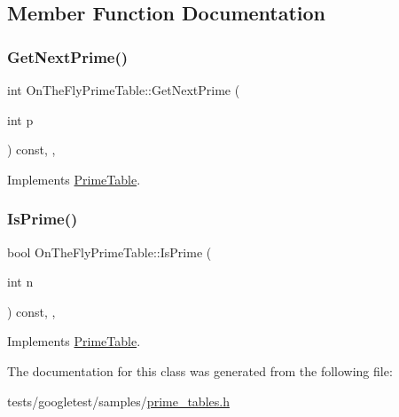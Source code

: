 \subsection{Member Function Documentation}
\mbox{\label{classOnTheFlyPrimeTable_a0f6f934f318407a812098e67584b60bf}} 
\subsubsection{\texorpdfstring{Get\+Next\+Prime()}{GetNextPrime()}}
{\footnotesize\ttfamily int On\+The\+Fly\+Prime\+Table\+::\+Get\+Next\+Prime (\begin{DoxyParamCaption}\item[{int}]{p }\end{DoxyParamCaption}) const\hspace{0.3cm}{\ttfamily [inline]}, {\ttfamily [override]}, {\ttfamily [virtual]}}



Implements \hyperlink{classPrimeTable_ae537c939f56617d8937d57bbbae3ab30}{Prime\+Table}.

\mbox{\label{classOnTheFlyPrimeTable_ac8236514299e4558a5220c3e06f7f61a}} 
\subsubsection{\texorpdfstring{Is\+Prime()}{IsPrime()}}
{\footnotesize\ttfamily bool On\+The\+Fly\+Prime\+Table\+::\+Is\+Prime (\begin{DoxyParamCaption}\item[{int}]{n }\end{DoxyParamCaption}) const\hspace{0.3cm}{\ttfamily [inline]}, {\ttfamily [override]}, {\ttfamily [virtual]}}



Implements \hyperlink{classPrimeTable_a2ab9243364ded0c51541f641b2df362a}{Prime\+Table}.



The documentation for this class was generated from the following file\+:\begin{DoxyCompactItemize}
\item 
tests/googletest/samples/\hyperlink{prime__tables_8h}{prime\+\_\+tables.\+h}\end{DoxyCompactItemize}
